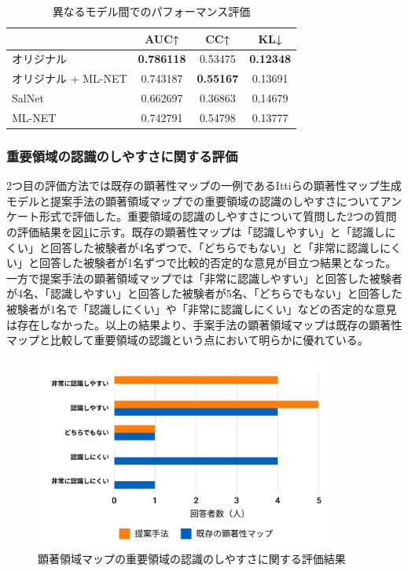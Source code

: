 \begin{table}[h]
  \caption{異なるモデル間でのパフォーマンス評価}
  \label{table:model-perfomance}
  \centering
  \begingroup
  \renewcommand{\arraystretch}{1.2} %
  \small
   \begin{tabular}{lccc}
    \hline
    & AUC↑ & CC↑ & KL↓ \\
    \hline \hline
    オリジナル & {\bf 0.786118} & 0.53475 & {\bf 0.12348} \\
    オリジナル + ML-NET & 0.743187 & {\bf 0.55167} & 0.13691 \\
    SalNet & 0.662697 & 0.36863 & 0.14679 \\
    ML-NET & 0.742791 & 0.54798 & 0.13777 \\
    \hline
  \end{tabular}
  \endgroup
\end{table}


\subsubsection{重要領域の認識のしやすさに関する評価}
\par 2つ目の評価方法では既存の顕著性マップの一例であるIttiらの顕著性マップ生成モデルと提案手法の顕著領域マップでの重要領域の認識のしやすさについてアンケート形式で評価した。重要領域の認識のしやすさについて質問した2つの質問の評価結果を図\ref{fig_evaluation02-1}に示す。既存の顕著性マップは「認識しやすい」と「認識しにくい」と回答した被験者が4名ずつで、「どちらでもない」と「非常に認識しにくい」と回答した被験者が1名ずつで比較的否定的な意見が目立つ結果となった。一方で提案手法の顕著領域マップでは「非常に認識しやすい」と回答した被験者が4名、「認識しやすい」と回答した被験者が5名、「どちらでもない」と回答した被験者が1名で「認識しにくい」や「非常に認識しにくい」などの否定的な意見は存在しなかった。以上の結果より、手案手法の顕著領域マップは既存の顕著性マップと比較して重要領域の認識という点において明らかに優れている。

\begin{figure}[H]
  \centering
  \includegraphics[width=10cm]{figures/07_result01.jpg}
  \caption{顕著領域マップの重要領域の認識のしやすさに関する評価結果}
  \label{fig_evaluation02-1}
\end{figure}

